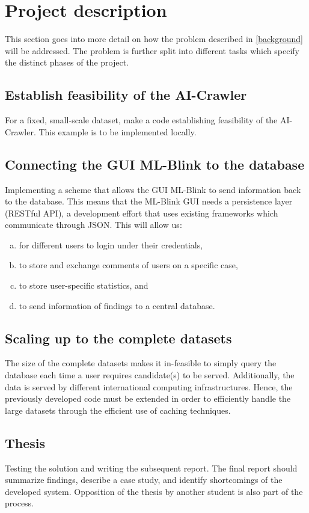 \section{Project description} \label{description}

This section goes into more detail on how the problem described in \ref{background} will be addressed. The problem is further split into different tasks which specify the distinct phases of the project.

\subsection{Establish feasibility of the AI-Crawler}

For a fixed, small-scale dataset, make a code establishing feasibility of the AI-Crawler. This example is to be implemented locally.

\subsection{Connecting the GUI ML-Blink to the database}

Implementing a scheme that allows the GUI ML-Blink to send information back to the database. This means that the ML-Blink GUI needs a persistence layer (RESTful API), a development effort that uses existing frameworks which communicate through JSON.  This will allow us:

\begin{enumerate}[(a)]
  \item for different users to login under their credentials,
  \item to store and exchange comments of users on a specific case,
  \item to store user-specific statistics, and
  \item to send information of findings to a central database.
\end{enumerate}

\subsection{Scaling up to the complete datasets}

The size of the complete datasets makes it in-feasible to simply query the database each time a user requires candidate(s) to be served. Additionally, the data is served by different international computing infrastructures. Hence, the previously developed code must be extended in order to efficiently handle the large datasets through the efficient use of caching techniques.

\subsection{Thesis}

Testing the solution and writing the subsequent report. The final report should summarize findings, describe a case study, and identify shortcomings of the developed system. Opposition of the thesis by another student is also part of the process.
